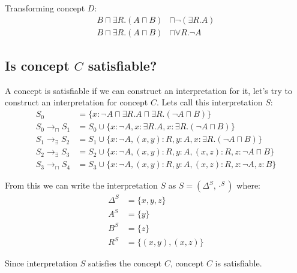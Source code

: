 \documentclass[a4paper,12pt]{article}
\begin{document}
Transforming concept $D$:
\begin{align*}
B \sqcap \exists R.(A \sqcap B) &\sqcap \neg(\exists R.A)\\
B \sqcap \exists R.(A \sqcap B) &\sqcap \forall R.\neg A
\end{align*}

\subsection[Concept C]{Is concept $C$ satisfiable?}
\label{interpretationforc}
A concept is satisfiable if we can construct an interpretation for it, let's
try to construct an interpretation for concept $C$.  Lets call this
interpretation $S$:
\begin{align*}
S_0 &= \{x : \neg A \sqcap \exists R.A \sqcap \exists  R.(\neg A \sqcap B)\}\\
S_0 \to_\sqcap S_1 &= S_0 \cup \{ x : \neg A, x : \exists R.A
                                , x : \exists R.(\neg A \sqcap B) \}\\
S_1 \to_\exists S_2 &= S_1 \cup \{ x : \neg A, (x,y) : R, y : A
                                 , x : \exists R.(\neg A \sqcap B) \}\\
S_2 \to_\exists S_3 &= S_2 \cup \{ x : \neg A, (x,y) : R, y : A
                                 , (x,z) : R, z : \neg A \sqcap B \}\\
S_3 \to_\sqcap S_4 &= S_3 \cup \{ x : \neg A, (x,y) : R, y : A
                                , (x,z) : R, z : \neg A, z : B \}
\end{align*}

From this we can write the interpretation $S$ as $ S = (\Delta^S, \cdot^S) $
where:
\begin{align*}
\Delta^S &= \{x,y,z\}\\
     A^S &= \{y\}\\
     B^S &= \{z\}\\
     R^S &= \{(x,y),(x,z)\}
\end{align*}

Since interpretation $S$ satisfies the concept $C$, concept $C$ is satisfiable.
\end{document}
